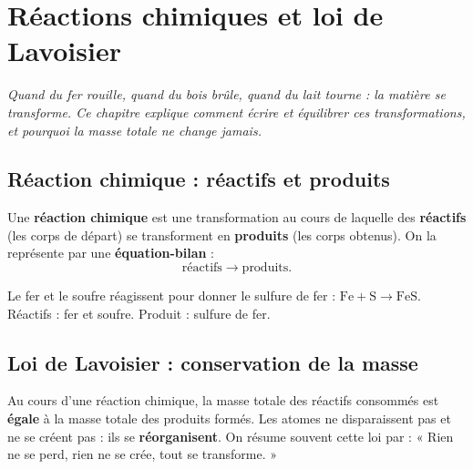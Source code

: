 \chapter{Réactions chimiques et loi de Lavoisier}

\noindent\textit{Quand du fer rouille, quand du bois brûle, quand du lait tourne : la
matière se transforme. Ce chapitre explique comment écrire et équilibrer ces
transformations, et pourquoi la masse totale ne change jamais.}
\vspace{8pt}

\connecteBanner

\section{Réaction chimique : réactifs et produits}

\begin{definition}
Une \textbf{réaction chimique} est une transformation au cours de laquelle des
\textbf{réactifs} (les corps de départ) se transforment en \textbf{produits} (les corps
obtenus). On la représente par une \textbf{équation-bilan} :
\[
\text{réactifs}\longrightarrow\text{produits}.
\]
\end{definition}

\begin{illus}
\end{illus}

\begin{exemple}
Le fer et le soufre réagissent pour donner le sulfure de fer :
$\mathrm{Fe}+\mathrm{S}\longrightarrow\mathrm{FeS}$. Réactifs : fer et soufre. Produit :
sulfure de fer.
\end{exemple}

\section{Loi de Lavoisier : conservation de la masse}

\begin{propriete}
Au cours d'une réaction chimique, la masse totale des réactifs consommés est
\textbf{égale} à la masse totale des produits formés. Les atomes ne disparaissent pas et
ne se créent pas : ils se \textbf{réorganisent}. On résume souvent cette loi par : « Rien
ne se perd, rien ne se crée, tout se transforme. »
\end{propriete}

